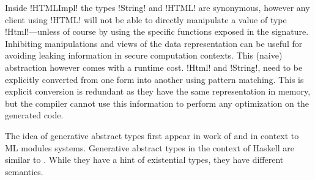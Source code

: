 \documentclass[manuscript,screen,nonacm]{acmart}
\begin{document}
Inside !HTMLImpl! the types !String! and !HTML! are synonymous, however any client using !HTML! will not be able to directly manipulate a value of type !Html!---unless of course by using the specific functions exposed in the signature. Inhibiting manipulations and views of the data representation can be useful for avoiding leaking information in secure computation contexts. This (naive) abstraction however comes with a runtime cost. !Html! and !String!, need to be explicitly converted from one form into another using pattern matching. This is explicit conversion is redundant as they have the same representation in memory, but the compiler cannot use this information to perform any optimization on the generated code.

The idea of generative abstract types first appear in work of \citet{leroy_applicative_1995} and \citet{milner_definition_1997} in context to ML modules systems. Generative abstract types in the context of Haskell are similar to \cite{montagu_modeling_2009}. While they have a hint of existential types, they have different semantics.




\end{document}
